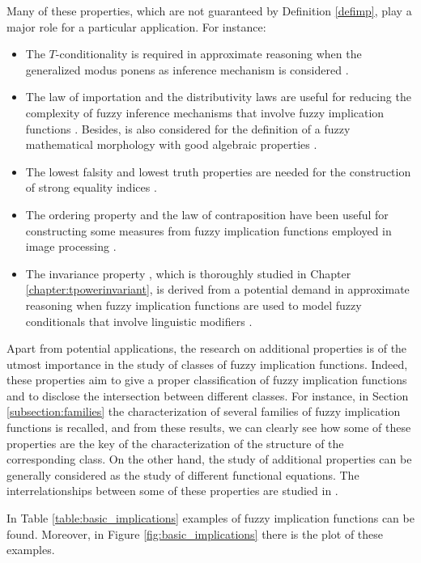 Many of these properties, which are not guaranteed by Definition \ref{defimp}, play a major role for a particular application. For instance:
\begin{itemize}
	\item The $T$-conditionality is required in approximate reasoning when the generalized modus ponens as inference mechanism is considered \cite{Baczynski2008}.
	\item  The law of importation \LI and the distributivity laws are useful for reducing the complexity of fuzzy inference mechanisms that involve fuzzy implication functions \cite{Combs1998,Jayaram2008,Jayaram2008B}. Besides, \LI is also considered for the definition of a fuzzy mathematical morphology with good algebraic properties \cite{Kerre2000}.
	\item The lowest falsity and lowest truth properties are needed for the construction of strong equality indices \cite{Bustince2013}.
	\item The ordering property \OP and the law of contraposition \CPN have been useful for constructing some measures from fuzzy implication functions employed in image processing \cite{Bustince2007,Bustince2008}.
	\item The invariance property \PIT, which is thoroughly studied in Chapter \ref{chapter:tpowerinvariant}, is derived from a potential demand in approximate reasoning when fuzzy implication functions are used to model fuzzy conditionals that involve linguistic modifiers \cite{Massanet2017}.
\end{itemize}

Apart from potential applications, the research on additional properties is of the utmost importance in the study of classes of fuzzy implication functions. Indeed, these properties aim to give a proper classification of fuzzy implication functions and to disclose the intersection between different classes. For instance, in Section \ref{subsection:families} the characterization of several families of fuzzy implication functions is recalled, and from these results, we can clearly see how some of these properties are the key of the characterization of the structure of the corresponding class. On the other hand, the study of additional properties can be generally considered as the study of different functional equations. The interrelationships between some of these properties are studied in \cite{Shi2010}.

In Table \ref{table:basic_implications} examples of fuzzy implication functions can be found. Moreover, in Figure \ref{fig:basic_implications} there is the plot of these examples.

